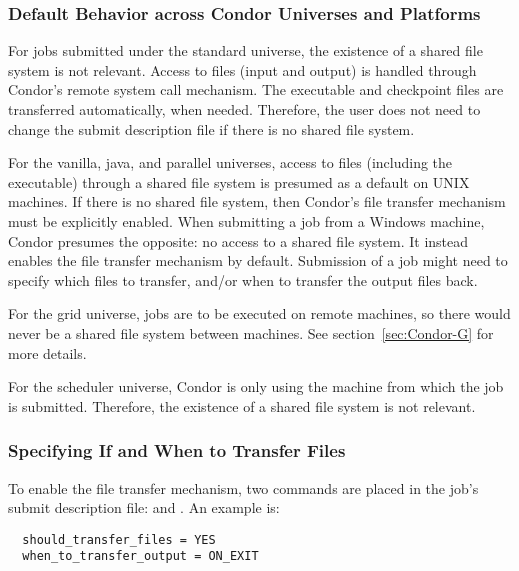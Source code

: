 \subsubsection{Default Behavior across Condor Universes and Platforms}

For jobs submitted under the standard universe,
the existence of a shared file system is not relevant.
Access to files (input and output) is handled through Condor's
remote system call mechanism.
The executable and checkpoint files are transferred automatically, when
needed. 
Therefore, the user does not need to change the submit description
file if there is no shared file system.

For the vanilla, java, and parallel universes, access to files (including
the executable) through a shared file system is presumed as a default
on UNIX machines.
If there is no shared file system, then Condor's file transfer
mechanism must be explicitly enabled.
When submitting a job from a Windows machine,
Condor presumes the opposite: no access to a shared file system.
It instead enables the file transfer mechanism by default.
Submission of a job might need to specify which files to
transfer, and/or when to transfer the output files back.

For the grid universe,
jobs are to be executed on remote machines, so there would never
be a shared file system between machines.
See section~\ref{sec:Condor-G} for more details.

For the scheduler universe,
Condor is only using the machine from which the job is submitted.
Therefore, the existence of a shared file system is not relevant.


\subsubsection{Specifying If and When to Transfer Files
\label{sec:file-transfer-if-when}}

To enable the file transfer mechanism, two commands are
placed in the job's submit description file:
 and .
An example is:

\begin{verbatim}
  should_transfer_files = YES
  when_to_transfer_output = ON_EXIT
\end{verbatim}

